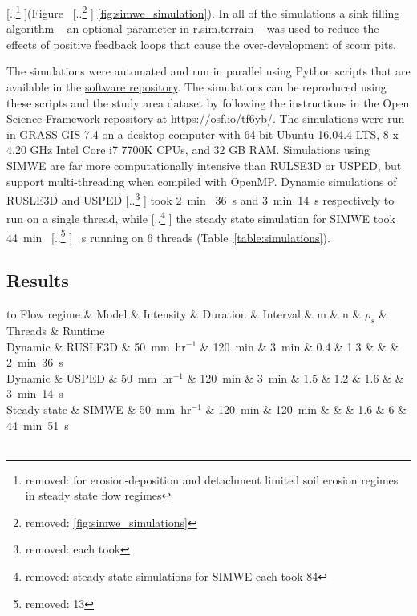 \documentclass[gmd, manuscript]{copernicus}
\providecommand{\DIFadd}[1]{{\protect\color{blue} \sf #1}} %
\providecommand{\DIFdel}[1]{{\protect\color{red} [..\footnote{removed: #1} ]}} %
\providecommand{\DIFaddbegin}{} %
\providecommand{\DIFaddend}{} %
\providecommand{\DIFdelbegin}{} %
\providecommand{\DIFdelend}{} %
\begin{document}
\DIFdelbegin \DIFdel{for erosion-deposition 
and detachment limited soil erosion regimes 
in steady state flow regimes
}\DIFdelend (Figure~\DIFdelbegin \DIFdel{\ref{fig:simwe_simulations}}\DIFdelend \DIFaddbegin \DIFadd{\ref{fig:simwe_simulation}}\DIFaddend ). 
%
In all of the simulations 
a sink filling algorithm
-- an optional parameter in r.sim.terrain -- 
was used to reduce the effects of positive feedback loops
that cause the over-development of scour pits. 

The simulations were automated and run in parallel
using Python scripts that are available in the 
\href{https://github.com/baharmon/landscape_evolution}{software repository}.
The simulations can be reproduced using these scripts
and the study area dataset 
by following the instructions 
in the Open Science Framework repository 
at \url{https://osf.io/tf6yb/}.
The simulations were run 
in GRASS GIS 7.4 
on a desktop computer 
with 64-bit Ubuntu 16.04.4 LTS,
8 x 4.20 GHz Intel Core i7 7700K CPUs,
and 32 GB RAM. 
Simulations using SIMWE 
are far more computationally intensive
than RULSE3D or USPED, 
but support multi-threading 
when compiled with OpenMP. 
Dynamic simulations of RUSLE3D and USPED \DIFdelbegin \DIFdel{each took
}\DIFdelend \DIFaddbegin \DIFadd{took
2~}\unit{min}\DIFadd{~36~}\unit{s} \DIFadd{and 
}\DIFaddend 3~\unit{min}~14~\unit{s} \DIFaddbegin \DIFadd{respectively
}\DIFaddend to run on a single thread, 
while \DIFdelbegin \DIFdel{steady state simulations for SIMWE each took 
84}\DIFdelend \DIFaddbegin \DIFadd{the steady state simulation for SIMWE took 
44}\DIFaddend ~\unit{min}~\DIFdelbegin \DIFdel{13}\DIFdelend \DIFaddbegin \DIFadd{51}\DIFaddend ~\unit{s} running on 6 threads
(Table~\ref{table:simulations}).

\subsection{Results}

\DIFaddbegin 
\DIFadd{
\begin{table}
\small
\caption{Landscape evolution simulations}
\begin{tabu} to \textwidth {XXXXXllllX}
\toprule
Flow regime & Model & Intensity & Duration & Interval & m & n & $\rho_s$ & Threads & Runtime\\
\midrule
Dynamic & RUSLE3D & 50~\unit{mm~hr}$^{-1}$ & 120~\unit{min} & 3~\unit{min} &  0.4 & 1.3 & & & 2~\unit{min}~36~\unit{s}\\
Dynamic & USPED & 50~\unit{mm~hr}$^{-1}$ & 120~\unit{min} & 3~\unit{min} &  1.5 & 1.2 & 1.6 & & 3~\unit{min}~14~\unit{s}\\
Steady state & SIMWE & 50~\unit{mm~hr}$^{-1}$ & 120~\unit{min} & 120~\unit{min} & & & 1.6 & 6 & 44~\unit{min}~51~\unit{s}\\
\bottomrule
\\
\end{tabu}
\label{table:simulations} 
\end{table}
}
\DIFaddend
\end{document}
